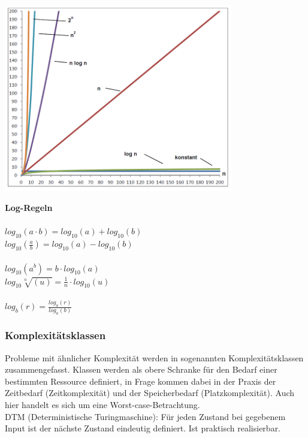 \begin{minipage}{10cm}
\includegraphics[width=10cm]{images/Algorithmen/Wachstumsfunktionen.png}
\end{minipage}\qquad
\begin{minipage}{10cm}
\textbf{Log-Regeln}\\\\
$log_{10} (a \cdot b) = log_{10}(a)+log_{10}(b)$\\
$log_{10} (\frac{a}{b}) = log_{10}(a) - log_{10}(b)$\\ \\
$log_{10}(a^b) = b \cdot log_{10}(a)$\\
$log_{10}\sqrt[n]{(u)} = \frac{1}{n}\cdot log_{10}(u)$\\ \\
$log_{b}(r) = \frac{log_{a}(r)}{log_{a}(b)}$

\end{minipage}
\subsubsection{Komplexitätsklassen}
Probleme mit ähnlicher Komplexität werden in sogenannten Komplexitätsklassen zusammengefasst. Klassen werden als obere Schranke für den Bedarf einer bestimmten Ressource definiert, in Frage kommen dabei in der Praxis der Zeitbedarf (Zeitkomplexität) und der Speicherbedarf (Platzkomplexität). Auch hier handelt es sich um eine Worst-case-Betrachtung.\\

DTM (Deterministische Turingmaschine): Für jeden Zustand bei gegebenem Input ist der nächste Zustand eindeutig definiert. Ist praktisch realisierbar.\\

